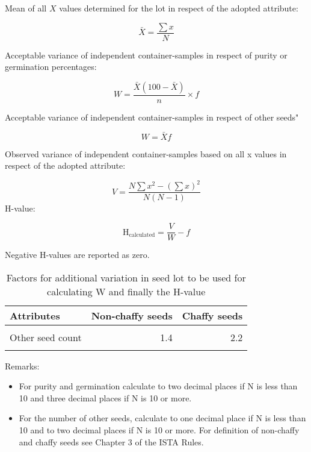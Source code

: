\documentclass[]{book}
\providecommand{\tightlist}{%
  \setlength{\itemsep}{0pt}\setlength{\parskip}{0pt}}
\begin{document}
Mean of all \(X\) values determined for the lot in respect of the
adopted attribute:

\[
\bar{X} = \frac{\sum{x}}{N}
\]

Acceptable variance of independent container-samples in respect of
purity or germination percentages:

\[
W = \frac{\bar{X}(100-\bar{X})}{n}\times f
\]

Acceptable variance of independent container-samples in respect of other
seeds"

\[
W = \bar{X} f
\]

Observed variance of independent container-samples based on all x values
in respect of the adopted attribute:

\[
V = \frac{N\sum{x}^2 - (\sum{x})^2}{N(N-1)}
\] H-value:

\[
\mathrm{H_{calculated}} = \frac{V}{W} - f
\]

Negative H-values are reported as zero.

\begin{table}

\caption{\label{tab:unnamed-chunk-2}Factors for additional variation in seed lot to be used for calculating W and finally the H-value}
\centering
\fontsize{10}{12}\selectfont
\begin{tabular}[t]{lrr}
\toprule
Attributes & Non-chaffy seeds & Chaffy seeds\\
\midrule
\cellcolor{gray!6}{Purity} & \cellcolor{gray!6}{1.1} & \cellcolor{gray!6}{1.2}\\
Other seed count & 1.4 & 2.2\\
\cellcolor{gray!6}{Germination} & \cellcolor{gray!6}{1.1} & \cellcolor{gray!6}{1.2}\\
\bottomrule
\end{tabular}
\end{table}

Remarks:

\begin{itemize}
\tightlist
\item
  For purity and germination calculate to two decimal places if N is
  less than 10 and three decimal places if N is 10 or more.
\item
  For the number of other seeds, calculate to one decimal place if N is
  less than 10 and to two decimal places if N is 10 or more. For
  definition of non-chaffy and chaffy seeds see Chapter 3 of the ISTA
  Rules.
\end{itemize}
\end{document}
